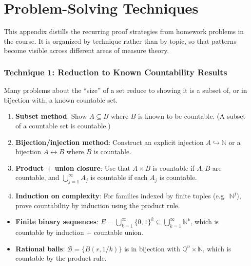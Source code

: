 \documentclass[11pt]{report}
\begin{document}
\newpage
\appendix
\chapter{Problem-Solving Techniques}

This appendix distills the recurring proof strategies from homework problems in the course. It is organized by technique rather than by topic, so that patterns become visible across different areas of measure theory.

\subsection{Technique 1: Reduction to Known Countability Results}

Many problems about the ``size'' of a set reduce to showing it is a subset of, or in bijection with, a known countable set.

\begin{rembox}[Strategy]
\begin{enumerate}[label=(\roman*)]
\item \textbf{Subset method}: Show $A \subseteq B$ where $B$ is known to be countable. (A subset of a countable set is countable.)
\item \textbf{Bijection/injection method}: Construct an explicit injection $A \hookrightarrow \mathbb{N}$ or a bijection $A \leftrightarrow B$ where $B$ is countable.
\item \textbf{Product + union closure}: Use that $A \times B$ is countable if $A, B$ are countable, and $\bigcup_{j=1}^\infty A_j$ is countable if each $A_j$ is countable.
\item \textbf{Induction on complexity}: For families indexed by finite tuples (e.g.\ $\mathbb{N}^j$), prove countability by induction using the product rule.
\end{enumerate}
\end{rembox}

\begin{exbox}[Applications (HW1)]
\begin{itemize}
\item \textbf{Finite binary sequences}: $E = \bigcup_{k=1}^\infty \{0,1\}^k \subseteq \bigcup_{k=1}^\infty \mathbb{N}^k$, which is countable by induction + countable union.
\item \textbf{Rational balls}: $\mathcal{B} = \{B(r, 1/k)\}$ is in bijection with $\mathbb{Q}^n \times \mathbb{N}$, which is countable by the product rule.
\end{itemize}
\end{exbox}
\end{document}
